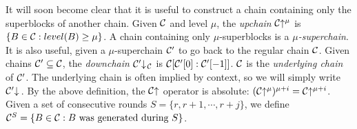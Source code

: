 It will soon become clear that it is useful to construct a chain containing only
the superblocks of another chain. Given $\mathcal{C}$ and level $\mu$, the
\textit{upchain} $\mathcal{C}\negthickspace\uparrow^\mu$ is $\{B \in \mathcal{C}: level(B) \geq \mu\}$.
A chain containing only $\mu$-superblocks is a $\mu$\textit{-superchain}. It is
also useful, given a $\mu$-superchain $\mathcal{C}'$ to go back to the regular chain
$\mathcal{C}$. Given chains $\mathcal{C}' \subseteq \mathcal{C}$, the \textit{downchain}
$\mathcal{C}'\negthickspace\downarrow\,\!\!_{\mathcal{C}}$ is $\mathcal{C}[\mathcal{C}'[0]:\mathcal{C}'[-1]]$. $\mathcal{C}$
is the \textit{underlying chain} of $\mathcal{C}'$. The underlying chain is often
implied by context, so we will simply write $\mathcal{C}'\negthickspace\downarrow\,$. By the above
definition, the $\mathcal{C}\negthickspace\uparrow$ operator is absolute:
$(\mathcal{C}\negthickspace\uparrow^\mu)^{\mu + i} = \mathcal{C}\negthickspace\uparrow^{\mu + i}$. Given a set of
consecutive rounds $S = \{r, r + 1, \cdots, r + j\}$, we define $\mathcal{C}^S = \{B
\in \mathcal{C}: B \text{ was generated during } S\}$.
